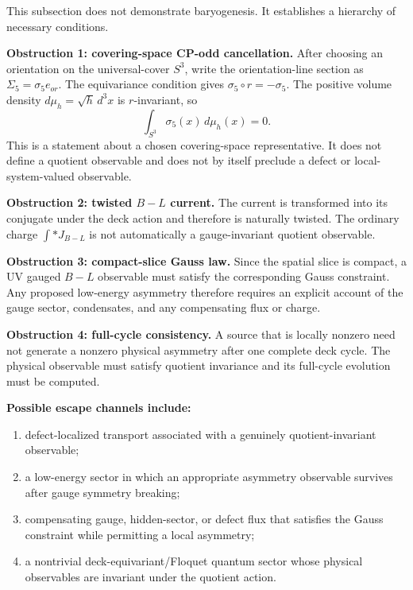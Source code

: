 \documentclass[11pt]{article}
\theoremstyle{canonmath}
\theoremstyle{canonpostulate}
\theoremstyle{canonclaim}
\def\mathrm#1{#1}%
\begin{document}
This subsection does not demonstrate baryogenesis. It establishes a hierarchy of necessary conditions.

\textbf{Obstruction 1: covering-space CP-odd cancellation.} After choosing an orientation on the universal-cover $S^3$, write the orientation-line section as $\Sigma_5=\sigma_5 e_{\mathrm{or}}$. The equivariance condition gives $\sigma_5\circ r=-\sigma_5$. The positive volume density $d\mu_h=\sqrt h\,d^3x$ is $r$-invariant, so
\begin{equation}
\int_{S^3}\sigma_5(x)\,d\mu_h(x)=0.
\end{equation}
This is a statement about a chosen covering-space representative. It does not define a quotient observable and does not by itself preclude a defect or local-system-valued observable.

\textbf{Obstruction 2: twisted $B-L$ current.} The current is transformed into its conjugate under the deck action and therefore is naturally twisted. The ordinary charge $\int *J_{B-L}$ is not automatically a gauge-invariant quotient observable.

\textbf{Obstruction 3: compact-slice Gauss law.} Since the spatial slice is compact, a UV gauged $B-L$ observable must satisfy the corresponding Gauss constraint. Any proposed low-energy asymmetry therefore requires an explicit account of the gauge sector, condensates, and any compensating flux or charge.

\textbf{Obstruction 4: full-cycle consistency.} A source that is locally nonzero need not generate a nonzero physical asymmetry after one complete deck cycle. The physical observable must satisfy quotient invariance and its full-cycle evolution must be computed.

\textbf{Possible escape channels include:}
\begin{enumerate}
\item defect-localized transport associated with a genuinely quotient-invariant observable;
\item a low-energy sector in which an appropriate asymmetry observable survives after gauge symmetry breaking;
\item compensating gauge, hidden-sector, or defect flux that satisfies the Gauss constraint while permitting a local asymmetry;
\item a nontrivial deck-equivariant/Floquet quantum sector whose physical observables are invariant under the quotient action.
\end{enumerate}
\end{document}
